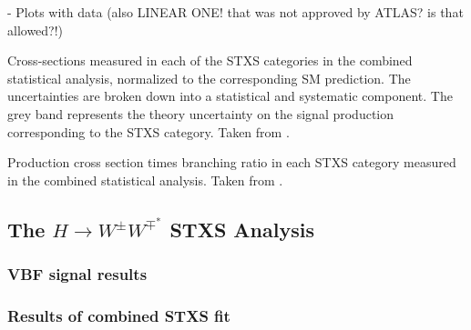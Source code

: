- Plots with data (also LINEAR ONE! that was not approved by ATLAS? is that allowed?!)

\begin{table}
    \caption{Cross-sections measured in each of the STXS categories in the combined statistical analysis, normalized to the corresponding SM prediction. The uncertainties are broken down into a statistical and systematic component. The grey band represents the theory uncertainty on the signal production corresponding to the STXS category. Taken from .}
    \label{fig:stxs-pois-bar-plot}
\end{table}

\begin{table}
    \caption{Production cross section times \HWW branching ratio in each STXS category measured in the combined statistical analysis. Taken from .}
    \label{fig:stxs-xsec-uncertainties}
\end{table}


\subsection{The $H\rightarrow W^{\pm}W^{\mp^*}$ STXS Analysis}

\subsubsection{VBF signal results}

\subsubsection{Results of combined STXS fit}







